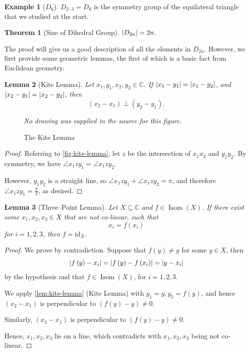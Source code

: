 \documentclass{article}
\newtheorem{theorem}{Theorem}[section]
\newtheorem{lemma}[theorem]{Lemma}
\theoremstyle{definition}
\newtheorem*{example*}{Example}
\theoremstyle{remark}
\DeclarePairedDelimiter{\abs}{\lvert}{\rvert}
\newcommand{\pqty}[1]{\left(#1\right)}
\newcommand{\identity}{\mathrm{id}}
\newcommand{\CC}{\mathbb{C}}
\newcommand{\Isom}{\operatorname{Isom}}
\begin{document}
\begin{example*}[\(D_6\)]
    \(D_{2 \cdot 3} = D_6\) is the symmetry group of the equilateral triangle that we studied at the start.
\end{example*}

\begin{theorem}[Size of Dihedral Group]
    \label{thm:size-of-dihedral-group}%
    \(\abs{D_{2n}} = 2n\).
\end{theorem}

The proof will give us a good description of all the elements in \(D_{2n}\). However, we first provide some geometric lemmas, the first of which is a basic fact from Euclidean geometry.

\begin{lemma}[Kite Lemma]
    \label{lem:kite-lemma}%
    Let \(x_1, y_1, x_2, y_2 \in \CC\). If \(\abs{x_1 - y_1} = \abs{x_1 - y_2}\), and \(\abs{x_2 - y_1} = \abs{x_2 - y_2}\), then
    \[
        \pqty{x_2 - x_1} \perp \pqty{y_2 - y_1}.
    \]
\end{lemma}

\begin{figure}[ht!]
    \centering
    \emph{No drawing was supplied in the source for this figure.}\par
\caption{The Kite Lemma}
    \label{fig:kite-lemma}
\end{figure}

\begin{proof}
    Referring to \autoref{fig:kite-lemma}, let \(z\) be the intersection of \(x_1 x_2\) and \(y_1 y_2\). By symmetry, we have \(\angle x_1 z y_1 = \angle x_1 z y_2\).

    However, \(y_1 y_2\) is a straight line, so \(\angle x_1 z y_1 + \angle x_1 z y_2 = \pi\), and therefore \(\angle x_1 z y_1 = \frac{\pi}{2}\), as desired.
\end{proof}

\begin{lemma}[Three--Point Lemma]
    \label{lem:three-point-lemma}%
    Let \(X \subseteq \CC\) and \(f \in \Isom\pqty{X}\). If there exist some \(x_1, x_2, x_3 \in X\) that are not co-linear, such that
    \[
        x_i = f\pqty{x_i}
    \]
    for \(i = 1, 2, 3\), then \(f = \identity_{X}\).
\end{lemma}

\begin{proof}
    We prove by contradiction. Suppose that \(f\pqty{y} \neq y\) for some \(y \in X\), then
    \[
        \abs{f\pqty{y} - x_i} = \abs{f\pqty{y} - f\pqty{x_i}} = \abs{y - x_i}
    \]
    by the hypothesis and that \(f \in \Isom\pqty{X}\), for \(i = 1, 2, 3\).

    We apply \autoref{lem:kite-lemma} (Kite Lemma) with \(y_1 = y, y_2 = f\pqty{y}\), and hence \(\pqty{x_2 - x_1}\) is perpendicular to \(\pqty{f\pqty{y} - y} \neq 0\).

    Similarly, \(\pqty{x_3 - x_1}\) is perpendicular to \(\pqty{f\pqty{y} - y} \neq 0\).

    Hence, \(x_1, x_2, x_3\) lie on a line, which contradicts with \(x_1, x_2, x_3\) being not co-linear.
\end{proof}
\end{document}
